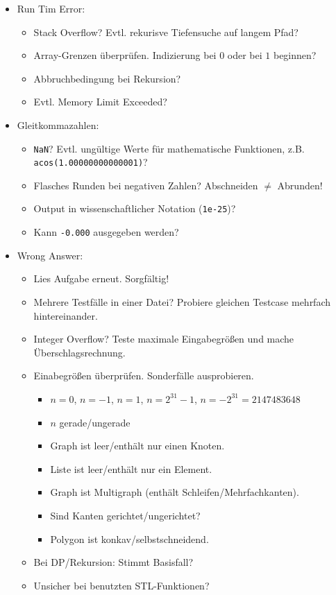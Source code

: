 \begin{itemize}
	\item Run Tim Error:
	\begin{itemize}
		\item Stack Overflow? Evtl. rekurisve Tiefensuche auf langem Pfad?
		\item Array-Grenzen überprüfen. Indizierung bei $0$ oder bei $1$ beginnen?
		\item Abbruchbedingung bei Rekursion?
		\item Evtl. Memory Limit Exceeded?
	\end{itemize}

	\item Gleitkommazahlen:
	\begin{itemize}
		\item \lstinline{NaN}? Evtl. ungültige Werte für mathematische Funktionen, z.B. \lstinline{acos(1.00000000000001)}?
		\item Flasches Runden bei negativen Zahlen? Abschneiden $\neq$ Abrunden!
		\item Output in wissenschaftlicher Notation (\lstinline{1e-25})?
		\item Kann \lstinline{-0.000} ausgegeben werden?
	\end{itemize}

	\item Wrong Answer:
	\begin{itemize}
		\item Lies Aufgabe erneut. Sorgfältig!
		\item Mehrere Testfälle in einer Datei? Probiere gleichen Testcase mehrfach hintereinander.
		\item Integer Overflow? Teste maximale Eingabegrößen und mache Überschlagsrechnung.
		\item Einabegrößen überprüfen. Sonderfälle ausprobieren.
		\begin{itemize}
			\item $n = 0$, $n = -1$, $n = 1$, $n = 2^{31}-1$, $n = -2^{31} = 2147483648$
			\item $n$ gerade/ungerade
			\item Graph ist leer/enthält nur einen Knoten.
			\item Liste ist leer/enthält nur ein Element.
			\item Graph ist Multigraph (enthält Schleifen/Mehrfachkanten).
			\item Sind Kanten gerichtet/ungerichtet?
			\item Polygon ist konkav/selbstschneidend.
		\end{itemize}
		\item Bei DP/Rekursion: Stimmt Basisfall?
		\item Unsicher bei benutzten STL-Funktionen?
	\end{itemize}
\end{itemize}
